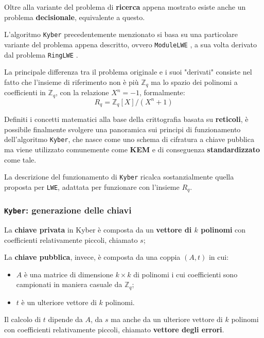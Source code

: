 \documentclass[a4paper, 12pt, oneside]{article}
\theoremstyle{definition}
\begin{document}
Oltre alla variante del problema di \textbf{ricerca} appena mostrato esiste anche un problema \textbf{decisionale}, equivalente a questo.

L'algoritmo \texttt{Kyber} precedentemente menzionato si basa su una particolare variante del problema appena descritto, ovvero \texttt{ModuleLWE} \cite{cryptoeprint:2012/090}, a sua volta derivato dal problema \texttt{RingLWE} \cite{cryptoeprint:2012/230}.

La principale differenza tra il problema originale e i suoi "derivati" consiste nel fatto che l'insieme di riferimento non è più $\mathbb{Z}_q$ ma lo spazio dei polinomi a coefficienti in $\mathbb{Z}_q$, con la relazione $ X^n = - 1 $, formalmente: \[ R_q = \mathbb{Z}_q [X] / (X^n + 1)\]

Definiti i concetti matematici alla base della crittografia basata su \textbf{reticoli}, è possibile finalmente svolgere una panoramica sui principi di funzionamento dell'algoritmo \texttt{Kyber}, che nasce come uno schema di cifratura a chiave pubblica ma viene utilizzato comunemente come \textbf{KEM} e di conseguenza \textbf{standardizzato} come tale.

La descrizione del funzionamento di \texttt{Kyber} \cite{kyber-definition} ricalca sostanzialmente quella proposta per \texttt{LWE}, adattata per funzionare con l'insieme $R_q$.

\newpage
\subsubsection{\texttt{Kyber}: generazione delle chiavi}

La \textbf{chiave privata} in Kyber è composta da un \textbf{vettore di $k$ polinomi} con coefficienti relativamente piccoli, chiamato $s$;

La \textbf{chiave pubblica}, invece, è composta da una coppia $(A, t)$ in cui:

\begin{itemize}
    \item $A$ è una matrice di dimensione $k \times k$ di polinomi i cui coefficienti sono campionati in maniera casuale da $\mathbb{Z}_q$;
    \item $t$ è un ulteriore vettore di $k$ polinomi.
\end{itemize}

Il calcolo di $t$ dipende da $A$, da $s$ ma anche da un ulteriore vettore di $k$ polinomi con coefficienti relativamente piccoli, chiamato \textbf{vettore degli errori}.
\end{document}
